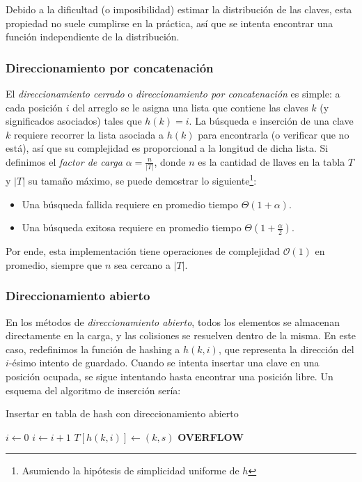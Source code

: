 \documentclass{article}
\newcommand{\BigO}[1]{{\mathcal{O}(#1)}}
\newcommand{\BigTheta}[1]{{\Theta(#1)}}
\begin{document}
Debido a la dificultad (o imposibilidad) estimar la distribución de las claves, esta propiedad no suele cumplirse en la práctica, así que se intenta encontrar una función independiente de la distribución.

\subsubsection{Direccionamiento por concatenación}

El \textit{direccionamiento cerrado} o \textit{direccionamiento por concatenación} es simple: a cada posición $i$ del arreglo se le asigna una lista que contiene las claves $k$ (y significados asociados) tales que $h(k) = i$. La búsqueda e inserción de una clave $k$ requiere recorrer la lista asociada a $h(k)$ para encontrarla (o verificar que no está), así que su complejidad es proporcional a la longitud de dicha lista. Si definimos el \textit{factor de carga} $\alpha = \frac{n}{|T|}$, donde $n$ es la cantidad de llaves en la tabla $T$ y $|T|$ su tamaño máximo, se puede demostrar lo siguiente\footnote{Asumiendo la hipótesis de simplicidad uniforme de $h$}:
\begin{itemize}
    \item Una búsqueda fallida requiere en promedio tiempo $\BigTheta{1 + \alpha}$.
    \item Una búsqueda exitosa requiere en promedio tiempo $\BigTheta{1 + \frac{\alpha}{2}}$.
\end{itemize}

Por ende, esta implementación tiene operaciones de complejidad $\BigO{1}$ en promedio, siempre que $n$ sea cercano a $|T|$.

\subsubsection{Direccionamiento abierto}

En los métodos de \textit{direccionamiento abierto}, todos los elementos se almacenan directamente en la carga, y las colisiones se resuelven dentro de la misma. En este caso, redefinimos la función de hashing a $h(k, i)$, que representa la dirección del $i$-ésimo intento de guardado. Cuando se intenta insertar una clave en una posición ocupada, se sigue intentando hasta encontrar una posición libre. Un esquema del algoritmo de inserción sería:
\begin{algorithm}[H]
    \caption*{Insertar en tabla de hash con direccionamiento abierto}
    \begin{algorithmic}
        \State $i \gets 0$
        \State $i \gets i + 1$
        \EndWhile
        \State $T[h(k, i)] \gets (k, s)$
        \Else
        \State \textbf{OVERFLOW}
        \EndIf
        \EndFunction
    \end{algorithmic}
\end{algorithm}
\end{document}
